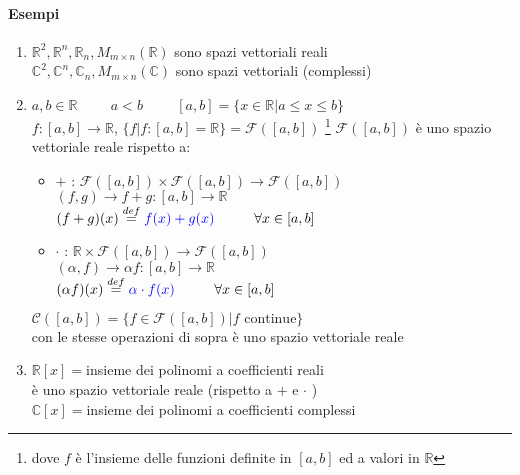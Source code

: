 \paragraph{Esempi}
\begin{enumerate}
    \item $\mathbb{R}^2, \mathbb{R}^n, \mathbb{R}_n, M_{m\times n}(\mathbb{R})$ 
        sono spazi vettoriali reali \\
    $\mathbb{C}^2, \mathbb{C}^n, \mathbb{C}_n, M_{m\times n}(\mathbb{C})$ sono spazi vettoriali 
        (complessi)
    \item $a,b\in\mathbb{R}\hspace{1cm} a<b\hspace{1cm} [a,b]=\{x\in\mathbb{R}|a\leq x \leq b\}$\\
    $f:[a,b]\longrightarrow \mathbb{R}$, \hspace{1cm} $\{f|f:[a,b]=\mathbb{R}\}=\mathcal{F}([a,b])$ 
        \footnote{dove $f$ è l'insieme delle funzioni definite in $[a,b]$ 
        ed a valori in $\mathbb{R}$}
$\mathcal{F}([a,b])$ è uno spazio vettoriale reale rispetto a:
\begin{itemize}
    \item $\pmb{+}$ : $\mathcal{F}([a,b])\times \mathcal{F}([a,b])
        \longrightarrow \mathcal{F}([a,b])$  \\
        $(f,g)\longrightarrow f + g : [a,b]\longrightarrow \mathbb{R}$\\
        $(f+g)(x)\overset{def}{=}{\color{blue}f(x)+g(x)}\hspace{1cm}\forall x \in [a,b]$
    \item $\pmb{\cdot}$ : $\mathbb{R}\times\mathcal{F}([a,b])\longrightarrow \mathcal{F}([a,b])$\\
        $(\alpha, f)\longrightarrow \alpha f: [a,b]\longrightarrow \mathbb{R}$\\
        $(\alpha f)(x)\overset{def}{=}{\color{blue} \alpha\cdot f(x)}\hspace{1cm}\forall x\in [a,b]$
\end{itemize}
{\color{green}
    $\mathcal{C}([a,b]) = \{f \in \mathcal{F}([a,b])| f \textrm{ continue}\}$\\
    con le stesse operazioni di sopra è uno spazio vettoriale reale
}
    \item $\mathbb{R}[x] = $insieme dei polinomi a coefficienti reali \\
        è uno spazio vettoriale reale (rispetto a $+$ e $\cdot$ ) \\
    $\mathbb{C}[x] = $insieme dei polinomi a coefficienti complessi \\

\end{enumerate}
